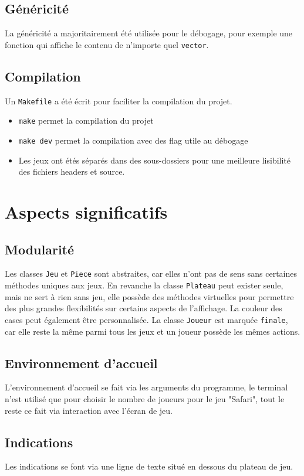 \documentclass{article}
\begin{document}
\subsection{Généricité}
La généricité a majoritairement été utilisée pour le débogage, pour exemple
une fonction qui affiche le contenu de n'importe quel \texttt{vector}.

\subsection{Compilation}
Un \texttt{Makefile} a été écrit pour faciliter la compilation du projet.
\begin{itemize}
  \item \texttt{make} permet la compilation du projet
  \item \texttt{make dev} permet la compilation avec des flag utile au débogage
  \item Les jeux ont étés séparés dans des sous-dossiers pour une meilleure
        lisibilité des fichiers headers et source.
\end{itemize}

\section{Aspects significatifs}
\subsection{Modularité}
Les classes \texttt{Jeu} et \texttt{Piece} sont abstraites, car elles n'ont pas
de sens sans certaines méthodes uniques aux jeux. En revanche la classe
\texttt{Plateau} peut exister seule, mais ne sert à rien sans jeu, elle
possède des méthodes virtuelles pour permettre des plus grandes flexibilités
sur certains aspects de l'affichage. La couleur des cases peut également être
personnalisée. La classe \texttt{Joueur} est marquée \texttt{finale}, car elle
reste la même parmi tous les jeux et un joueur possède les mêmes actions.

\subsection{Environnement d'accueil}
L'environnement d'accueil se fait via les arguments du programme, le terminal
n'est utilisé que pour choisir le nombre de joueurs pour le jeu "Safari", tout
le reste ce fait via interaction avec l'écran de jeu.

\subsection{Indications}
Les indications se font via une ligne de texte situé en dessous du plateau
de jeu.
\end{document}
